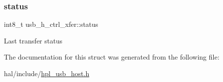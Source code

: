 \subsubsection{\texorpdfstring{status}{status}}
{\footnotesize\ttfamily int8\+\_\+t usb\+\_\+h\+\_\+ctrl\+\_\+xfer\+::status}

Last transfer status 

The documentation for this struct was generated from the following file\+:\begin{DoxyCompactItemize}
\item 
hal/include/\hyperlink{hpl__usb__host_8h}{hpl\+\_\+usb\+\_\+host.\+h}\end{DoxyCompactItemize}
